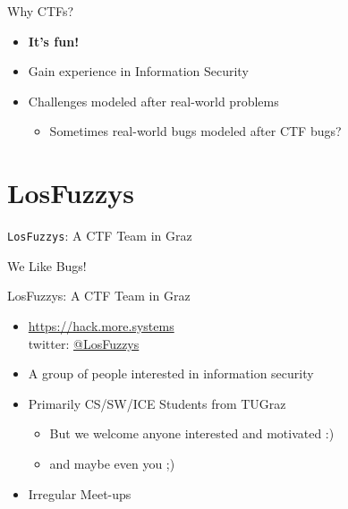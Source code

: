 \begin{frame}
  {Why CTFs?}

  \begin{itemize}
    \item \textbf{It's fun!}
    \item Gain experience in Information Security
    \item Challenges modeled after real-world problems
      \begin{itemize}
        \item Sometimes real-world bugs modeled after CTF bugs?
      \end{itemize}
  \end{itemize}
\end{frame}

\section{LosFuzzys}

{
\begin{frame}

  {\huge
    \texttt{LosFuzzys}: A CTF Team in Graz}

  \vspace{19em}

  {\Large
  We Like Bugs!}

\end{frame}
}

\begin{frame}
  {LosFuzzys: A CTF Team in Graz}

  \begin{itemize}
    \item \url{https://hack.more.systems}
      \\ twitter: \href{https://twitter.com/LosFuzzys}{@LosFuzzys}
    \item A group of people interested in information security
    \item Primarily CS/SW/ICE Students from TUGraz
      \begin{itemize}
        \item But we welcome anyone interested and motivated :)
        \item and maybe even you ;)
      \end{itemize}
    \item Irregular Meet-ups
  \end{itemize}
\end{frame}

